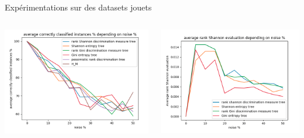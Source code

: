 \documentclass[usenames,dvipsnames]{beamer}
\begin{document}
\begin{frame}{Expérimentations sur des datasets jouets}
    \begin{columns}
        \begin{column}{0.45\textwidth}
            \centering
            \includegraphics[width=\textwidth]{acc_2.png}
        \end{column}
        \begin{column}{0.45\textwidth}
            \centering
            \includegraphics[width=\textwidth]{shannon_eval_2.png}
        \end{column}
    \end{columns}
    \begin{columns}
        \begin{column}{0.45\textwidth}

\end{column}
\end{columns}
\end{frame}
\end{document}
